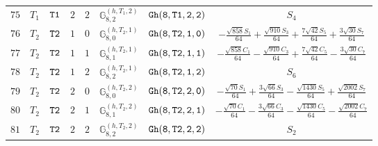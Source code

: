 \documentclass[fleqn,8pt]{jsarticle}
\begin{document}
\begin{table}[ht!]
\begin{center}
\begin{tabular}{cccccccc}
$ 75 $ & $ T_{1} $ & $ {\tt T1} $ & $ 2 $ & $ 2 $ & $ \mathbb{G}_{8,2}^{(h,T_{1},2)} $ & $ {\tt Gh(8,T1,2,2)} $ & $ S_{4} $ \\
$ 76 $ & $ T_{2} $ & $ {\tt T2} $ & $ 1 $ & $ 0 $ & $ \mathbb{G}_{8,0}^{(h,T_{2},1)} $ & $ {\tt Gh(8,T2,1,0)} $ & $ - \frac{\sqrt{858} S_{1}}{64} + \frac{\sqrt{910} S_{3}}{64} + \frac{7 \sqrt{42} S_{5}}{64} + \frac{3 \sqrt{30} S_{7}}{64} $ \\
$ 77 $ & $ T_{2} $ & $ {\tt T2} $ & $ 1 $ & $ 1 $ & $ \mathbb{G}_{8,1}^{(h,T_{2},1)} $ & $ {\tt Gh(8,T2,1,1)} $ & $ - \frac{\sqrt{858} C_{1}}{64} - \frac{\sqrt{910} C_{3}}{64} + \frac{7 \sqrt{42} C_{5}}{64} - \frac{3 \sqrt{30} C_{7}}{64} $ \\
$ 78 $ & $ T_{2} $ & $ {\tt T2} $ & $ 1 $ & $ 2 $ & $ \mathbb{G}_{8,2}^{(h,T_{2},1)} $ & $ {\tt Gh(8,T2,1,2)} $ & $ S_{6} $ \\
$ 79 $ & $ T_{2} $ & $ {\tt T2} $ & $ 2 $ & $ 0 $ & $ \mathbb{G}_{8,0}^{(h,T_{2},2)} $ & $ {\tt Gh(8,T2,2,0)} $ & $ - \frac{\sqrt{70} S_{1}}{64} + \frac{3 \sqrt{66} S_{3}}{64} - \frac{\sqrt{1430} S_{5}}{64} + \frac{\sqrt{2002} S_{7}}{64} $ \\
$ 80 $ & $ T_{2} $ & $ {\tt T2} $ & $ 2 $ & $ 1 $ & $ \mathbb{G}_{8,1}^{(h,T_{2},2)} $ & $ {\tt Gh(8,T2,2,1)} $ & $ - \frac{\sqrt{70} C_{1}}{64} - \frac{3 \sqrt{66} C_{3}}{64} - \frac{\sqrt{1430} C_{5}}{64} - \frac{\sqrt{2002} C_{7}}{64} $ \\
$ 81 $ & $ T_{2} $ & $ {\tt T2} $ & $ 2 $ & $ 2 $ & $ \mathbb{G}_{8,2}^{(h,T_{2},2)} $ & $ {\tt Gh(8,T2,2,2)} $ & $ S_{2} $ \\
 \hline \hline
\end{tabular}
\end{center}
\end{table}
\end{document}
